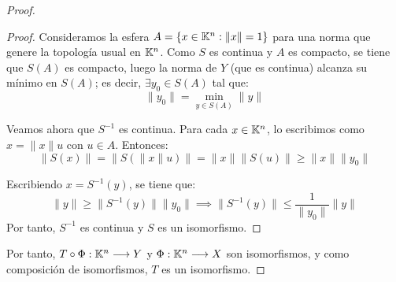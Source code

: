 \documentclass[12pt]{article}
\begin{document}
\begin{ejercicio}[5 puntos]
\begin{proof}
\begin{proof}
                Consideramos la esfera $A=\{x \in \mathbb{K}^n : \|x\| = 1\}$ para una norma que genere la topología usual en $\mathbb{K}^n$. Como $S$ es continua y $A$ es compacto, se tiene que $S(A)$ es compacto, luego la norma de $Y$ (que es continua) alcanza su mínimo en $S(A)$; es decir, $\exists y_0 \in S(A)$ tal que:
                \begin{equation*}
                    \|y_0\| = \min_{y \in S(A)} \|y\|
                \end{equation*}

                Veamos ahora que $S^{-1}$ es continua. Para cada $x\in \mathbb{K}^n$, lo escribimos como $x = \|x\|u$ con $u \in A$. Entonces:
                \begin{equation*}
                    \|S(x)\| = \|S(\|x\|u)\| = \|x\|\|S(u)\| \geq \|x\|\|y_0\|
                \end{equation*}
                
                Escribiendo $x=S^{-1}(y)$, se tiene que:
                \begin{equation*}
                    \|y\| \geq \|S^{-1}(y)\|\|y_0\| \implies \|S^{-1}(y)\| \leq \frac{1}{\|y_0\|}\|y\|
                \end{equation*}
                Por tanto, $S^{-1}$ es continua y $S$ es un isomorfismo.
            \end{proof}

            Por tanto, $T\circ \Phi: \mathbb{K}^n \longrightarrow Y$ y $\Phi: \mathbb{K}^n \longrightarrow X$ son isomorfismos, y como composición de isomorfismos, $T$ es un isomorfismo.
        \end{proof}
    \end{ejercicio}
\end{document}
